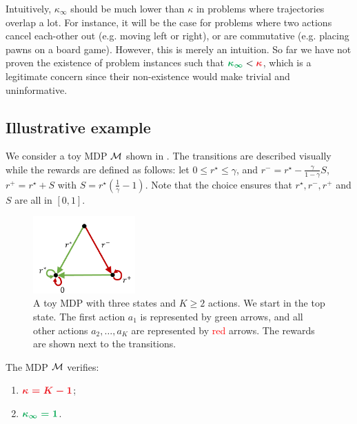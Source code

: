 \documentclass[runningheads]{llncs}
\begin{document}
Intuitively, $\kappa_\infty$ should be much lower than $\kappa$ in problems where trajectories overlap a lot. For instance, it will be the case for problems where two actions cancel each-other out (e.g. moving left or right), or are commutative (e.g. placing pawns on a board game). However, this is merely an intuition. So far we have not proven the existence of problem instances such that $\hlgb{\kappa_\infty} < \hlrb{\kappa}$, which is a legitimate concern since their non-existence would make  trivial and uninformative.

\subsection{Illustrative example}
\label{sec:illustrative-example}
We consider a toy MDP $\mathcal{M}$ shown in . The transitions are described visually while the rewards are defined as follows: let $0\leq r^\star\leq \gamma$, and $ r^- = r^\star - \frac{\gamma}{1-\gamma} S$, $r^+ = r^\star + S$ with $S = r^\star\left(\frac{1}{\gamma} - 1\right).$ Note that the choice ensures that $r^\star, r^-, r^+$ and $S$ are all in $[0, 1]$.

\begin{figure}[htp]
    \centering
    \includegraphics[trim={0.5cm 0.0cm 0.3cm 0.6cm}, clip, width=0.35\textwidth]{img/mdp.pdf}
    \caption{A toy MDP with three states and $K \geq 2$ actions. We start in the top state. The first action $a_1$ is represented by \textcolor{OliveGreen}{green} arrows, and all other actions $a_2, \dots, a_K$ are represented by \textcolor{red}{red} arrows. The rewards are shown next to the transitions.}
    \label{fig:mdp}
\end{figure}

\begin{proposition}
\label{prop:illustrative-example}
The MDP $\mathcal{M}$ verifies:
\begin{enumerate}[label=(\roman*)]
    \item $\hlrb{\kappa = K-1}$;
    \item $\hlgb{\kappa_\infty = 1}$.
\end{enumerate}
\end{proposition}
\end{document}
